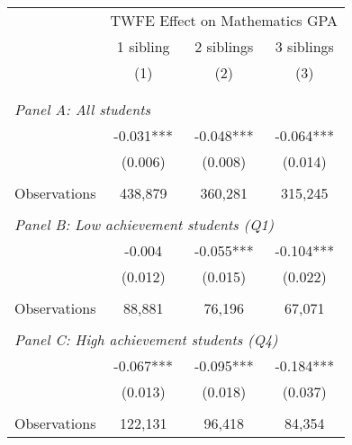 \makeatletter
{}
{
\makeatother
\begin{tabular}{lccc}
\toprule
\cmidrule(lr){2-4}
& \multicolumn{3}{c}{TWFE Effect on Mathematics GPA} \\
\cmidrule(lr){2-4}
& 1 sibling & 2 siblings & 3 siblings  \\
\cmidrule(lr){2-2} \cmidrule(lr){3-3} \cmidrule(lr){4-4}
& (1) & (2) & (3)\\
\bottomrule
&  &  &  \\
&  &  &   \\
\multicolumn{4}{l}{\textit{Panel A: All students}} \\
\hspace{3mm}        &      -0.031***&      -0.048***&      -0.064***\\
                    &     (0.006)   &     (0.008)   &     (0.014)   \\
                    &               &               &               \\
\hspace{3mm}Observations&     438,879   &     360,281   &     315,245   \\
 
&  &  &   \\
\multicolumn{4}{l}{\textit{Panel B: Low achievement students (Q1)}} \\
\hspace{3mm}        &      -0.004   &      -0.055***&      -0.104***\\
                    &     (0.012)   &     (0.015)   &     (0.022)   \\
                    &               &               &               \\
\hspace{3mm}Observations&      88,881   &      76,196   &      67,071   \\
 
&  &  &   \\
\multicolumn{4}{l}{\textit{Panel C: High achievement students (Q4)}} \\
\hspace{3mm}        &      -0.067***&      -0.095***&      -0.184***\\
                    &     (0.013)   &     (0.018)   &     (0.037)   \\
                    &               &               &               \\
\hspace{3mm}Observations&     122,131   &      96,418   &      84,354   \\
 

\end{tabular}}
